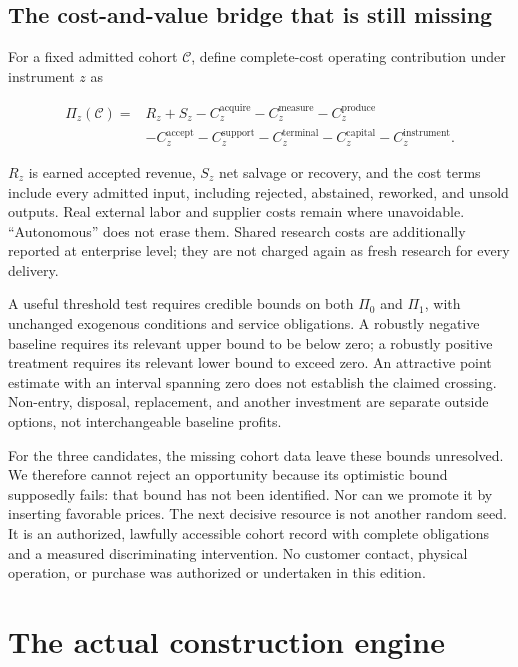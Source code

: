\subsection{The cost-and-value bridge that is still
missing}\label{the-cost-and-value-bridge-that-is-still-missing}

For a fixed admitted cohort \(\mathcal C\), define complete-cost
operating contribution under instrument \(z\) as

\[
\begin{aligned}
\Pi_z(\mathcal C)={}&R_z+S_z-C^{\mathrm{acquire}}_z-C^{\mathrm{measure}}_z-C^{\mathrm{produce}}_z\\
&-C^{\mathrm{accept}}_z-C^{\mathrm{support}}_z-C^{\mathrm{terminal}}_z-C^{\mathrm{capital}}_z-C^{\mathrm{instrument}}_z.
\end{aligned}
\]

\(R_z\) is earned accepted revenue, \(S_z\) net salvage or recovery, and
the cost terms include every admitted input, including rejected,
abstained, reworked, and unsold outputs. Real external labor and
supplier costs remain where unavoidable. ``Autonomous'' does not erase
them. Shared research costs are additionally reported at enterprise
level; they are not charged again as fresh research for every delivery.

A useful threshold test requires credible bounds on both \(\Pi_0\) and
\(\Pi_1\), with unchanged exogenous conditions and service obligations.
A robustly negative baseline requires its relevant upper bound to be
below zero; a robustly positive treatment requires its relevant lower
bound to exceed zero. An attractive point estimate with an interval
spanning zero does not establish the claimed crossing. Non-entry,
disposal, replacement, and another investment are separate outside
options, not interchangeable baseline profits.

For the three candidates, the missing cohort data leave these bounds
unresolved. We therefore cannot reject an opportunity because its
optimistic bound supposedly fails: that bound has not been identified.
Nor can we promote it by inserting favorable prices. The next decisive
resource is not another random seed. It is an authorized, lawfully
accessible cohort record with complete obligations and a measured
discriminating intervention. No customer contact, physical operation, or
purchase was authorized or undertaken in this edition.

\section{The actual construction engine}\label{mechanism}


